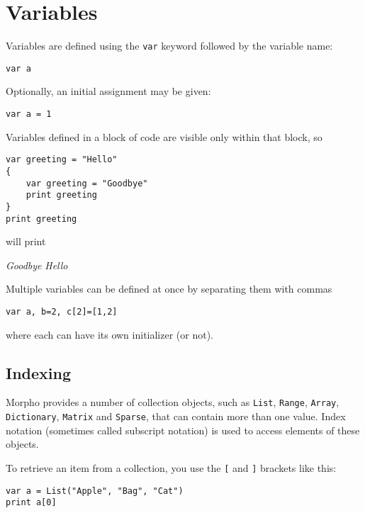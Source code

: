 \hypertarget{variables}{%
\section{Variables}\label{variables}}

Variables are defined using the \texttt{var} keyword followed by the
variable name:

\begin{lstlisting}
var a
\end{lstlisting}

Optionally, an initial assignment may be given:

\begin{lstlisting}
var a = 1
\end{lstlisting}

Variables defined in a block of code are visible only within that block,
so

\begin{lstlisting}
var greeting = "Hello"
{
    var greeting = "Goodbye"
    print greeting
}
print greeting
\end{lstlisting}

will print

\emph{Goodbye} \emph{Hello}

Multiple variables can be defined at once by separating them with commas

\begin{lstlisting}
var a, b=2, c[2]=[1,2]
\end{lstlisting}

where each can have its own initializer (or not).

\hypertarget{indexing}{%
\subsection{Indexing}\label{indexing}}

Morpho provides a number of collection objects, such as \texttt{List},
\texttt{Range}, \texttt{Array}, \texttt{Dictionary}, \texttt{Matrix} and
\texttt{Sparse}, that can contain more than one value. Index notation
(sometimes called subscript notation) is used to access elements of
these objects.

To retrieve an item from a collection, you use the \texttt{{[}} and
\texttt{{]}} brackets like this:

\begin{lstlisting}
var a = List("Apple", "Bag", "Cat")
print a[0]
\end{lstlisting}

